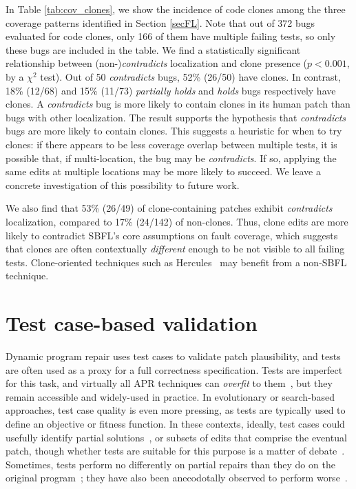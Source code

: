 \documentclass[10pt, conference]{IEEEtran}
\begin{document}
In Table \ref{tab:cov_clones}, we show the incidence of code clones among the three 
coverage patterns identified in Section \ref{secFL}. Note that out of 372 bugs evaluated for code clones, only 166 of them have multiple failing tests, so only these bugs are included in the table.  
We find a statistically significant relationship between (non-)\emph{contradicts}
localization and clone presence ($p < 0.001$, by a $\chi^2$ test).
Out of 50 \emph{contradicts} bugs, 52\% (26/50) have clones. In contrast,  
18\% (12/68) and 15\% (11/73)
\emph{partially holds} and \emph{holds} bugs respectively have clones.
A \emph{contradicts} bug is more likely to contain clones in its
human patch than bugs with other localization. 
The result supports the hypothesis that \emph{contradicts} bugs are more likely to contain 
clones. This suggests a heuristic for when to try clones: if there
appears to be less coverage overlap between multiple tests, it is
possible that, if multi-location, the bug may be \emph{contradicts}.  If so,
applying the same edits at multiple locations may be more likely to succeed. We
leave a concrete investigation of this possibility to future work.

We also find that 53\% (26/49) of clone-containing patches exhibit 
\emph{contradicts} localization, compared to 17\% (24/142) of non-clones.
Thus, clone edits are more likely to contradict SBFL's core assumptions
on fault coverage, which suggests that clones are often contextually 
\emph{different} enough to be not visible to all failing tests.
Clone-oriented techniques such as Hercules~\cite{saha2019harnessing} may benefit
from a non-SBFL technique.

\section{Test case-based validation}
\label{sec:tests}

Dynamic program repair uses test cases to validate patch plausibility, and tests
are often used as a proxy for a full correctness specification. Tests are
imperfect for this task, and virtually all APR techniques can \emph{overfit} to
them~\cite{Smith15fse}, but they remain accessible and widely-used in practice.
%
In evolutionary or search-based approaches, test case quality is even more
pressing, as tests are typically used to define an objective or fitness
function. In these contexts, ideally, test cases could usefully identify partial
solutions~\cite{better-fitness}, or subsets of edits that comprise the eventual
patch, though whether tests are suitable for this purpose is a matter of
debate~\cite{ae,rsrepair}.  Sometimes, tests perform no differently on partial
repairs than they do on the original program~\cite{chris-thesis,
  source-code-checkpoint}; they have also been anecodotally observed to perform
worse~\cite{gecco09}.  
\end{document}

